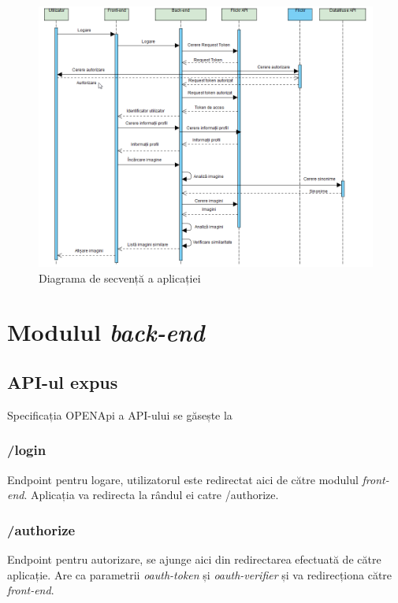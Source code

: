 \begin{figure}[!htbp]
    \begin{center}
        \includegraphics[width=1.0\textwidth]{images/secventa.png}
        \caption{Diagrama de secvență a aplicației}
    \end{center}
\end{figure}

\section{Modulul \textit{back-end}}

\subsection{API-ul expus}
Specificația OPENApi a API-ului se găsește la ~
\subsubsection{/login}
Endpoint pentru logare, utilizatorul este redirectat aici de către modulul \textit{front-end}. Aplicația va redirecta la rândul ei catre /authorize.

\subsubsection{/authorize}
Endpoint pentru autorizare, se ajunge aici din redirectarea efectuată de către aplicație. Are ca parametrii \textit{oauth-token} și \textit{oauth-verifier} și va redirecționa către \textit{front-end}.

